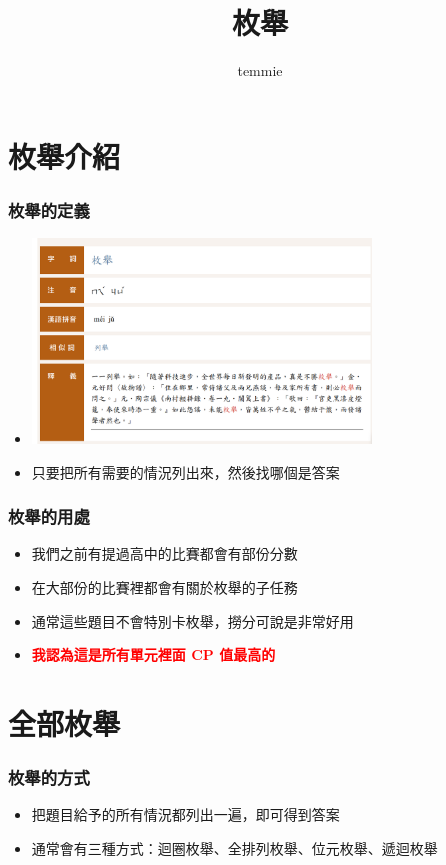 \documentclass{beamer}
\title{枚舉}
\author{temmie}
\date{}
\begin{document}
\begin{frame}
    \titlepage
\end{frame}

\begin{frame}
    \tableofcontents
\end{frame}

\section{枚舉介紹}

\begin{frame}
    \frametitle{枚舉的定義}
    \begin{itemize}
        \item \includegraphics[width=9.0cm]{img/img_1.png}
        \item 只要把所有需要的情況列出來，然後找哪個是答案
    \end{itemize}
\end{frame}

\begin{frame}
    \frametitle{枚舉的用處}
    \begin{itemize}
        \item 我們之前有提過高中的比賽都會有部份分數
        \item 在大部份的比賽裡都會有關於枚舉的子任務
        \item 通常這些題目不會特別卡枚舉，撈分可說是非常好用
        \item \textbf{\textcolor{red}{我認為這是所有單元裡面 CP 值最高的}}
    \end{itemize}
\end{frame}

\section{全部枚舉}

\begin{frame}
    \frametitle{枚舉的方式}
    \begin{itemize}
        \item 把題目給予的所有情況都列出一遍，即可得到答案
        \item 通常會有三種方式：迴圈枚舉、全排列枚舉、位元枚舉、遞迴枚舉
    \end{itemize}
\end{frame}
\end{document}
